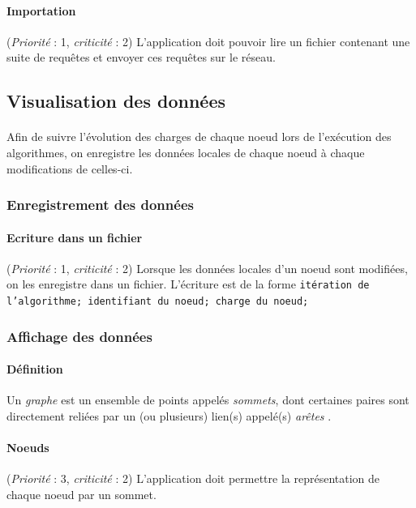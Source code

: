 \documentclass[12pt]{article}
\newcommand{\besoin}[2] {
  (\textit{Priorité} : #1, \textit{criticité} : #2)
}
\begin{document}
\paragraph{Importation} \besoin{1}{2} L'application doit pouvoir lire un fichier contenant une suite de requêtes et envoyer ces requêtes sur le réseau.


\subsection{Visualisation des données}

\paragraph{} Afin de suivre l'évolution des charges de chaque noeud lors de l'exécution des algorithmes, on enregistre les données locales de chaque noeud à chaque modifications de celles-ci.

\subsubsection{Enregistrement des données}

\paragraph{Ecriture dans un fichier} \besoin{1}{2} Lorsque les données locales d'un noeud sont modifiées, on les enregistre dans un fichier.
L'écriture est de la forme \texttt{itération de l'algorithme; identifiant du noeud; charge du noeud;}

\subsubsection{Affichage des données}

\paragraph{Définition} Un \textit{graphe} est un ensemble de points appelés \textit{sommets}, dont certaines paires sont directement reliées par un (ou plusieurs) lien(s) appelé(s) \textit{arêtes} \cite{graphe}. 

\paragraph{Noeuds} \besoin{3}{2} L'application doit permettre la représentation de chaque noeud par un sommet.
\end{document}
